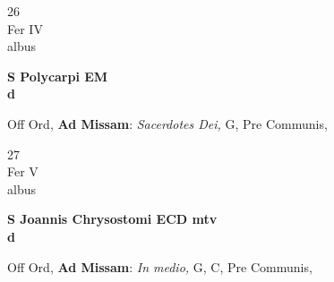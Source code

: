 \documentclass[10pt, openany]{book}
\begin{document}
        \begin{center}
            \begin{minipage}{3.5in}
                \vspace{2em}
                \begin{minipage}{0.5in}
                    {\Huge 26} \\
                    {\normalsize Fer IV} \\
                    {\normalsize albus}
                \end{minipage}
                \begin{minipage}{3.0in}
                    \textbf{ \large S Polycarpi EM \\
                    \textnormal{\normalsize d}} \\ 
                \end{minipage}
                \begin{justify}Off Ord, \textbf{Ad Missam}: \textit{Sacerdotes Dei,} G, Pre Communis,  
                \end{justify}
            \end{minipage}
        \end{center}
    
        \begin{center}
            \begin{minipage}{3.5in}
                \vspace{2em}
                \begin{minipage}{0.5in}
                    {\Huge 27} \\
                    {\normalsize Fer V} \\
                    {\normalsize albus}
                \end{minipage}
                \begin{minipage}{3.0in}
                    \textbf{ \large S Joannis Chrysostomi ECD mtv \\
                    \textnormal{\normalsize d}} \\ 
                \end{minipage}
                \begin{justify}Off Ord, \textbf{Ad Missam}: \textit{In medio,} G, C, Pre Communis,  
                \end{justify}
            \end{minipage}
        \end{center}
    
\end{document}
